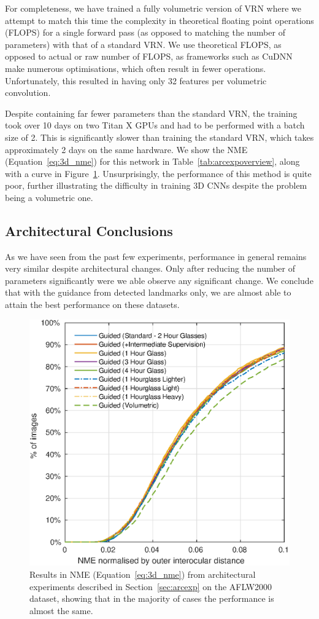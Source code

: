 For completeness, we have trained a fully volumetric version of VRN
where we attempt to match this time the complexity in theoretical
floating point operations (FLOPS) for a single forward pass (as
opposed to matching the number of parameters) with that of a standard
VRN. We use theoretical FLOPS, as opposed to actual or raw number of
FLOPS, as frameworks such as CuDNN make numerous optimisations, which
often result in fewer operations. Unfortunately, this resulted in
having only 32 features per volumetric convolution.

Despite containing far fewer parameters than the standard VRN, the
training took over 10 days on two Titan X GPUs and had to be performed
with a batch size of 2. This is significantly slower than training the
standard VRN, which takes approximately 2 days on the same
hardware. We show the NME (Equation~\ref{eq:3d_nme}) for this network in
Table~\ref{tab:arcexpoverview}, along with a curve in
Figure~\ref{fig:additionalexp}. Unsurprisingly, the performance of
this method is quite poor, further illustrating the difficulty in
training 3D CNNs despite the problem being a volumetric one.

\subsection{Architectural Conclusions}
As we have seen from the past few experiments, performance in general
remains very similar despite architectural changes. Only after
reducing the number of parameters significantly were we able observe
any significant change. We conclude that with the guidance from
detected landmarks only, we are almost able to attain the best performance on
these datasets.

\begin{figure}
  \centering
  \includegraphics[width=0.75\linewidth]{curves2/aflw.eps}
  \caption[NME performance from architectural experiments]{Results in
    NME (Equation~\ref{eq:3d_nme}) from architectural experiments
    described in Section~\ref{sec:arcexp} on the AFLW2000 dataset,
    showing that in the majority of cases the performance is almost
    the same.}
  \label{fig:additionalexp}
\end{figure}

